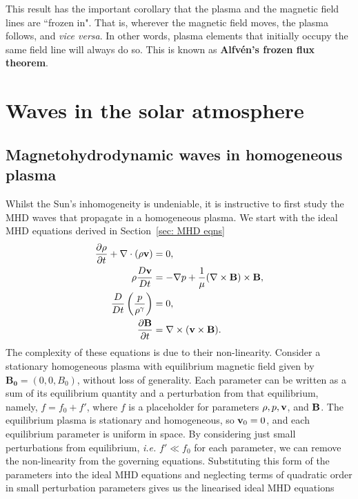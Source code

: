 \documentclass[12pt]{../style-files/ociamthesis}
\begin{document}
This result has the important corollary that the plasma and the magnetic field lines are ``frozen in". That is, wherever the magnetic field moves, the plasma follows, and \textit{vice versa}. In other words, plasma elements that initially occupy the same field line will always do so. This is known as \textbf{Alfv\'{e}n's frozen flux theorem}.


\section{Waves in the solar atmosphere}
\label{sec: waves}

\subsection{Magnetohydrodynamic waves in homogeneous plasma}
Whilst the Sun's inhomogeneity is undeniable, it is instructive to first study the MHD waves that propagate in a homogeneous plasma. We start with the ideal MHD equations derived in Section~\ref{sec: MHD eqns}
\begin{align}
	\frac{\partial\rho}{\partial t} + \nabla\cdot(\rho \mathbf{v}) &= 0, \\
	\rho\frac{D\mathbf{v}}{Dt} &= -\nabla p + \frac{1}{\mu}(\nabla\times\mathbf{B})\times\mathbf{B}, \\
	\frac{D}{Dt}\left(\frac{p}{\rho^\gamma}\right) &= 0, \\
	\frac{\partial\mathbf{B}}{\partial t} &= \nabla\times(\mathbf{v}\times\mathbf{B}).
\end{align}
The complexity of these equations is due to their non-linearity. Consider a stationary homogeneous plasma with equilibrium magnetic field given by $\mathbf{B_0} = (0, 0, B_0)$, without loss of generality. Each parameter can be written as a sum of its equilibrium quantity and a perturbation from that equilibrium, namely, $f = f_0 + f'$, where $f$ is a placeholder for parameters $\rho, p, \mathbf{v}$, and $\mathbf{B}$. The equilibrium plasma is stationary and homogeneous, so $\mathbf{v}_0 = 0$, and each equilibrium parameter is uniform in space. By considering just small perturbations from equilibrium, \textit{i.e.} $f' \ll f_0$ for each parameter, we can remove the non-linearity from the governing equations. Substituting this form of the parameters into the ideal MHD equations and neglecting terms of quadratic order in small perturbation parameters gives us the linearised ideal MHD equations
\end{document}
